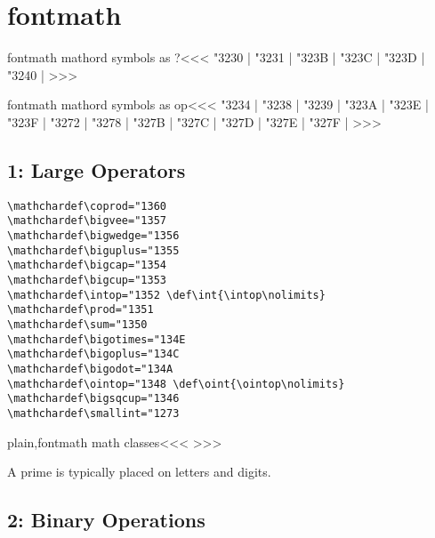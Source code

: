 {{%
\section{fontmath}




\<fontmath mathord symbols as ?\><<<
\mathchar"3230 |%
\mathchar"3231 |%
\mathchar"323B |%
\mathchar"323C |%
\mathchar"323D |%
\mathchar"3240 |%
>>>

\<fontmath mathord symbols as op\><<<
\mathchar"3234 |%
\mathchar"3238 |%
\mathchar"3239 |%
\mathchar"323A |%
\mathchar"323E |%
\mathchar"323F |%
\mathchar"3272 |%
\mathchar"3278 |%
\mathchar"327B |%
\mathchar"327C |%
\mathchar"327D |%
\mathchar"327E |%
\mathchar"327F |%
>>>



\subsection{1: Large Operators}

\begin{verbatim}
\mathchardef\coprod="1360
\mathchardef\bigvee="1357
\mathchardef\bigwedge="1356
\mathchardef\biguplus="1355
\mathchardef\bigcap="1354
\mathchardef\bigcup="1353
\mathchardef\intop="1352 \def\int{\intop\nolimits}
\mathchardef\prod="1351
\mathchardef\sum="1350
\mathchardef\bigotimes="134E
\mathchardef\bigoplus="134C
\mathchardef\bigodot="134A
\mathchardef\ointop="1348 \def\oint{\ointop\nolimits}
\mathchardef\bigsqcup="1346
\mathchardef\smallint="1273
\end{verbatim}

\<plain,fontmath math classes\><<<
>>>


A prime is typically  placed on letters and digits.


\subsection{2: Binary Operations}

}}
